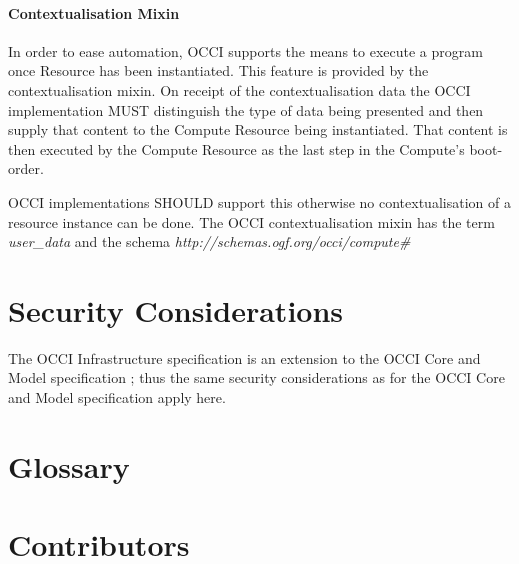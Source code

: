 \documentclass[10pt,a4paper]{article}
\begin{document}
\paragraph{Contextualisation Mixin}

In order to ease automation, OCCI supports the means to execute a 
program once Resource has been instantiated. This feature is 
provided by the contextualisation mixin. On receipt of the 
contextualisation data the OCCI implementation MUST distinguish 
the type of data being presented and then supply that content to the 
Compute Resource being instantiated. That content is then executed
by the Compute Resource as the last step in the Compute's boot-order.

OCCI implementations SHOULD support this otherwise no 
contextualisation of a resource instance can be done.
The OCCI contextualisation mixin has the term \textit{user\_data} 
and the schema \textit{http://schemas.ogf.org/occi/compute\#}


\section{Security Considerations}
The OCCI Infrastructure specification is an extension to the OCCI Core
and Model specification \cite{occi:core}; thus the same security
considerations as for the OCCI Core and Model specification apply
here.

\section{Glossary}
\label{sec:glossary}


\section{Contributors}

\end{document}
